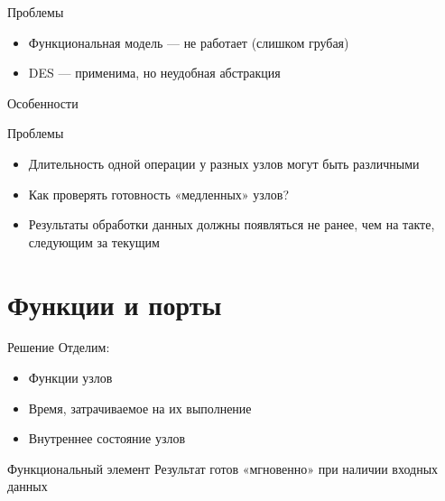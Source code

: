 \documentclass{beamer}
\begin{document}
\begin{frame}{Проблемы}
\begin{itemize}
    \item Функциональная модель — не работает (слишком грубая)
    \item DES — применима, но неудобная абстракция
\end{itemize}



\end{frame}

\begin{frame}{Особенности}


\end{frame}

\begin{frame}{Проблемы}
\begin{itemize}
\item Длительность одной операции у разных узлов могут быть различными
\item Как проверять готовность «медленных» узлов?
\item Результаты обработки данных должны появляться не ранее, чем на такте, следующим за текущим
\end{itemize}

\end{frame}

\section{Функции и порты}

\begin{frame}{Решение}
Отделим:
    \begin{itemize}
    \item Функции узлов
    \item Время, затрачиваемое на их выполнение
    \item Внутреннее состояние узлов
    \end{itemize}
\end{frame}

\begin{frame}{Функциональный элемент}
Результат готов «мгновенно» при наличии входных данных

\vfill
\centering


\end{frame}
\end{document}
